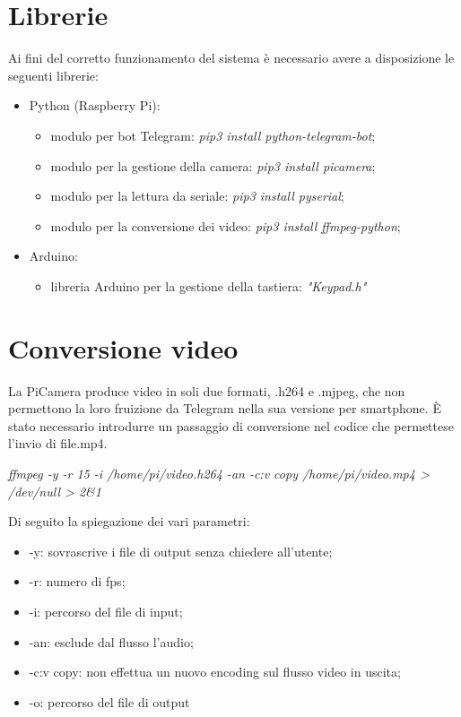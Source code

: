 \documentclass[12pt]{article}
\begin{document}
	\section{Librerie}
	Ai fini del corretto funzionamento del sistema è necessario avere a disposizione le seguenti 
	librerie:
	\begin{itemize}
		\item Python (Raspberry Pi):
		\begin{itemize}
			\item modulo per bot Telegram: \textit{pip3 install python-telegram-bot};
			\item modulo per la gestione della camera: \textit{pip3 install picamera};
			\item modulo per la lettura da seriale: \textit{pip3 install pyserial};
			\item modulo per la conversione dei video: \textit{pip3 install ffmpeg-python};
		\end{itemize}
		\item Arduino:
		\begin{itemize}
			\item libreria Arduino per la gestione della tastiera: \textit{"Keypad.h"}
		\end{itemize}
	\end{itemize}

	\section{Conversione video}
	La PiCamera produce video in soli due formati, .h264 e .mjpeg, che non permettono la loro 
	fruizione da Telegram nella sua versione per smartphone. È stato necessario introdurre un 
	passaggio di conversione nel codice che permettese l'invio di file.mp4.

	\textit{ffmpeg -y -r 15 -i /home/pi/video.h264 -an -c:v copy /home/pi/video.mp4 > /dev/null > 2\&1}

	Di seguito la spiegazione dei vari parametri:
	\begin{itemize}
		\item -y: sovrascrive i file di output senza chiedere all'utente;
		\item -r: numero di fps;
		\item -i: percorso del file di input;
		\item -an: esclude dal flusso l'audio;
		\item -c:v copy: non effettua un nuovo encoding sul flusso video in uscita;
		\item -o: percorso del file di output
	\end{itemize}
\end{document}
